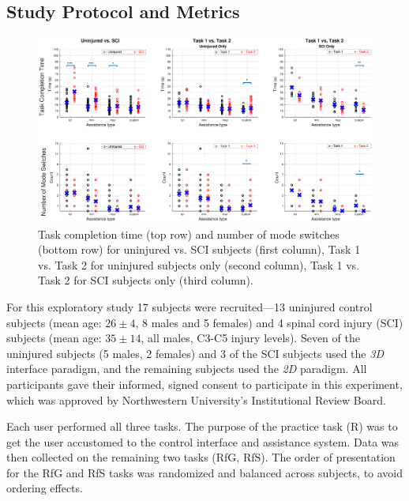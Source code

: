 \documentclass[letterpaper, 10 pt, journal, twoside]{IEEEtran}  %
\begin{document}
	\subsection{Study Protocol and Metrics}
	\begin{figure}[t]
		\centering
		\includegraphics[width=1.18\hsize, center]{./finalfigures/Figure4.eps}
		\vspace{-1.1cm}
		\caption{Task completion time (top row) and number of mode switches (bottom row) for uninjured vs. SCI subjects (first column), Task 1 vs. Task 2 for uninjured subjects only (second column), Task 1 vs. Task 2 for SCI subjects only (third column).}
		\label{PlotOne}
	\end{figure}
	\vspace{0.1cm}
	  For this exploratory
	study 17 subjects were recruited---13 uninjured control subjects (mean
	age: $26 \pm 4$, 8 males and 5 females) and 4 spinal cord injury (SCI) subjects (mean age: $35 \pm 14$, all males, C3-C5 injury
	levels). Seven of the uninjured subjects (5 males, 2 females) and
	3 of the SCI subjects used the \textit{3D} interface paradigm, and the remaining
	subjects used the \textit{2D} paradigm.  All participants gave their
	informed, signed consent to participate in this experiment, which was
	approved by Northwestern University's Institutional Review Board.
	
	\vspace{0.1cm}
	 Each user performed all three
	tasks. The purpose of the practice task (R) was to get the user
	accustomed to the control interface and assistance system. Data was
	then collected on the remaining two tasks (RfG, RfS). The order of presentation
	for the RfG and RfS tasks was randomized and balanced across
	subjects, to avoid ordering effects.
	
\end{document}
